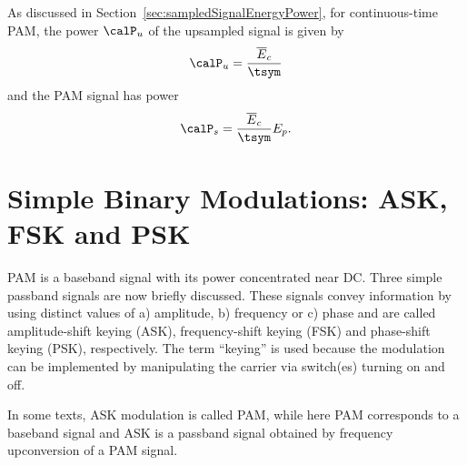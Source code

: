 As discussed in Section~\ref{sec:sampledSignalEnergyPower}, for continuous-time PAM, the power $\calP_u$ of the upsampled signal is given by
\begin{equation}
\calP_u = \frac{\overline E_c}{\tsym}
\label{eq:powerUpsampledSignalContinuousTime}
\end{equation}
and the PAM signal has power
\begin{equation}
\calP_s = \frac{\overline E_c}{\tsym} E_p.
\label{eq:pamPowerContinuousTime}
\end{equation}



\section{Simple Binary Modulations: ASK, FSK and PSK}
\label{sec:askfskpsk}

PAM is a baseband signal with its power concentrated near DC. Three simple passband signals are now briefly discussed. These signals convey information by using distinct values of a) amplitude, b) frequency  or c) phase and are called amplitude-shift keying (ASK), frequency-shift keying (FSK) and phase-shift keying (PSK), respectively. The term ``keying'' is used because the modulation can be implemented by manipulating the carrier via switch(es) turning on and off. 

In some texts, ASK modulation is called PAM, while here PAM corresponds to a baseband signal and ASK is a passband signal obtained by frequency upconversion of a PAM signal. 



